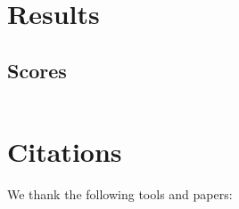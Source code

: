 \documentclass{article}
\begin{document}
\section{Results}



\subsection{Scores}
\begin{center}
    \begin{tabular}{ | l | l | l | p{2cm} |}
    \hline

    \hline
    \end{tabular}
\end{center}

\section{Citations}

We thank the following tools and papers: \\\\
\end{document}
